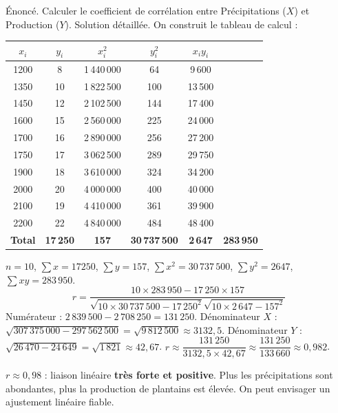 \documentclass[11pt]{article}
\begin{document}
\begin{exoresolu}
Énoncé. Calculer le coefficient de corrélation entre Précipitations ($X$) et Production ($Y$).
\tcblower
Solution détaillée. On construit le tableau de calcul :
\begin{center}
\begin{tabular}{|c|c|c|c|c|c|}
\hline
$x_i$ & $y_i$ & $x_i^2$ & $y_i^2$ & $x_i y_i$ \\
\hline
1200 & 8 & 1\,440\,000 & 64 & 9\,600 \\
1350 & 10 & 1\,822\,500 & 100 & 13\,500 \\
1450 & 12 & 2\,102\,500 & 144 & 17\,400 \\
1600 & 15 & 2\,560\,000 & 225 & 24\,000 \\
1700 & 16 & 2\,890\,000 & 256 & 27\,200 \\
1750 & 17 & 3\,062\,500 & 289 & 29\,750 \\
1900 & 18 & 3\,610\,000 & 324 & 34\,200 \\
2000 & 20 & 4\,000\,000 & 400 & 40\,000 \\
2100 & 19 & 4\,410\,000 & 361 & 39\,900 \\
2200 & 22 & 4\,840\,000 & 484 & 48\,400 \\
\hline
\textbf{Total} & \textbf{17\,250} & \textbf{157} & \textbf{30\,737\,500} & \textbf{2\,647} & \textbf{283\,950} \\
\hline
\end{tabular}
\end{center}
$n=10$, $\sum x = 17250$, $\sum y = 157$, $\sum x^2 = 30\,737\,500$, $\sum y^2 = 2647$, $\sum xy = 283\,950$.
\[ r = \frac{10 \times 283\,950 - 17\,250 \times 157}{\sqrt{10 \times 30\,737\,500 - 17\,250^2} \sqrt{10 \times 2\,647 - 157^2}} \]
Numérateur : $2\,839\,500 - 2\,708\,250 = 131\,250$.
Dénominateur $X$ : $\sqrt{307\,375\,000 - 297\,562\,500} = \sqrt{9\,812\,500} \approx 3132,5$.
Dénominateur $Y$ : $\sqrt{26\,470 - 24\,649} = \sqrt{1\,821} \approx 42,67$.
$r \approx \dfrac{131\,250}{3132,5 \times 42,67} \approx \dfrac{131\,250}{133\,660} \approx 0,982$.
\end{exoresolu}

\begin{aretenir}
$r \approx 0,98$ : liaison linéaire \textbf{très forte et positive}. Plus les précipitations sont abondantes, plus la production de plantains est élevée. On peut envisager un ajustement linéaire fiable.
\end{aretenir}
\end{document}
